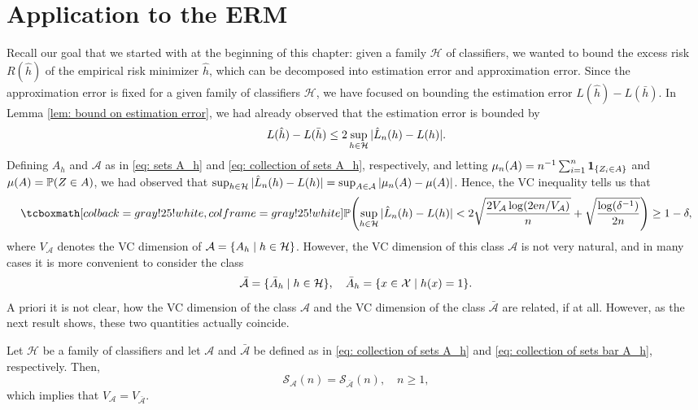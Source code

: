 \section{Application to the ERM}

Recall our goal that we started with at the beginning of this chapter: given a family $\mathcal{H}$ of classifiers, we wanted to bound the excess risk $R(\hat{h})$ of the empirical risk minimizer $\hat{h}$, which can be decomposed into estimation error and approximation error. Since the approximation error is fixed for a given family of classifiers $\mathcal{H}$, we have focused on bounding the estimation error $L(\hat{h}) - L(\bar{h})$. In Lemma \ref{lem: bound on estimation error}, we had already observed that the estimation error is bounded by
\[
    L(\hat{h}) - L(\bar{h}) \leq 2 \sup_{h \in \mathcal{H}} \abs*{\hat{L}_n(h) - L(h)}.
\]
Defining $A_h$ and $\mathcal{A}$ as in \eqref{eq: sets A_h} and \eqref{eq: collection of sets A_h}, respectively, and letting $\mu_n(A) = n^{-1} \sum_{i=1}^n \indSet{Z_i \in A}$ and $\mu(A) = \operatorname{\mathbb{P}}(Z \in A)$, we had observed that $\sup_{h \in \mathcal{H}} \abs*{\hat{L}_n(h) - L(h)} = \sup_{A \in \mathcal{A}} \abs{\mu_n(A) - \mu(A)}$. Hence, the VC inequality tells us that
\begin{equation}
\label{eq: VC ineqaulity for ERM}
    \highlightMath{
        \Prob\left(\sup_{h \in \mathcal{H}} \abs*{\hat{L}_n(h) - L(h)} < 2 \sqrt{\frac{2 V_{\mathcal{A}} \log(2 \e n / V_{\mathcal{A}})}{n}} + \sqrt{\frac{\log(\delta^{-1})}{2n}}\right) \geq 1 - \delta,
    }
\end{equation}
where $V_{\mathcal{A}}$ denotes the VC dimension of $\mathcal{A} = \set{A_h \with h \in \mathcal{H}}$. However, the VC dimension of this class $\mathcal{A}$ is not very natural, and in many cases it is more convenient to consider the class
\begin{equation}
\label{eq: collection of sets bar A_h}
    \bar{\mathcal{A}} = \{\bar A_h \with h \in \mathcal{H}\}, \quad \bar A_h = \set{x \in \mathcal{X} \with h(x) = 1}.
\end{equation}
A priori it is not clear, how the VC dimension of the class $\mathcal{A}$ and the VC dimension of the class $\bar{\mathcal{A}}$ are related, if at all. However, as the next result shows, these two quantities actually coincide.

\begin{theorem}
Let $\mathcal{H}$ be a family of classifiers and let $\mathcal{A}$ and $\bar{\mathcal{A}}$ be defined as in \eqref{eq: collection of sets A_h} and \eqref{eq: collection of sets bar A_h}, respectively. Then,
\[
    \mathcal{S}_{\mathcal{A}}(n) = \mathcal{S}_{\bar{\mathcal{A}}}(n), \quad n \geq 1,
\]
which implies that $V_{\mathcal{A}} = V_{\bar{\mathcal{A}}}$.
\end{theorem}

